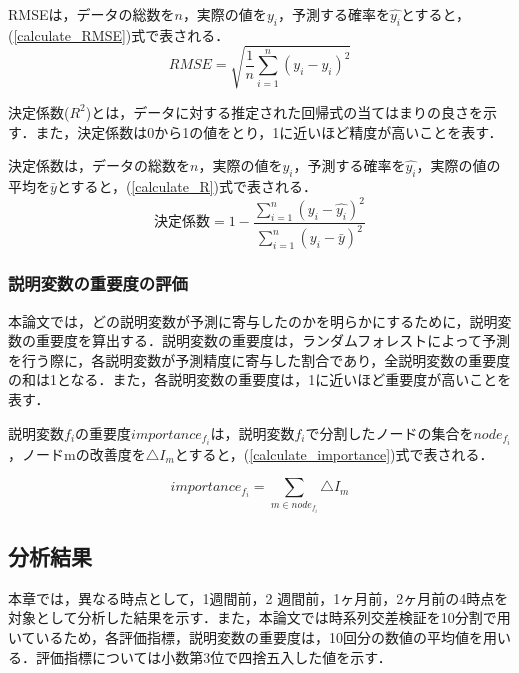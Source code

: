 \documentclass[submit,ses,noauthor]{ipsj}
\begin{document}
RMSEは，データの総数を\(n\)，実際の値を\(y_{i}\)，予測する確率を\(\hat{y_{i}}\)とすると，(\ref{calculate_RMSE})式で表される．
\begin{equation}
\label{calculate_RMSE}
RMSE = \sqrt{\frac{1}{n}\sum^{n}_{i=1}(y_{i} - \hat{y_{i}})^{2}}
\end{equation}

決定係数(\(R^{2}\))とは，データに対する推定された回帰式の当てはまりの良さを示す．また，決定係数は0から1の値をとり，1に近いほど精度が高いことを表す．

決定係数は，データの総数を\(n\)，実際の値を\(y_{i}\)，予測する確率を\(\hat{y_{i}}\)，実際の値の平均を\(\bar{y}\)とすると，(\ref{calculate_R})式で表される．
\begin{equation}
\label{calculate_R}
 \mbox{決定係数} = 1 -  \frac{\sum^{n}_{i=1}(y_{i} - \hat{y_{i}})^{2}}{\sum^{n}_{i=1}(y_{i} - \bar{y})^{2}}
 \end{equation}


\subsubsection{説明変数の重要度の評価}
本論文では，どの説明変数が予測に寄与したのかを明らかにするために，説明変数の重要度を算出する．説明変数の重要度は，ランダムフォレストによって予測を行う際に，各説明変数が予測精度に寄与した割合であり，全説明変数の重要度の和は1となる．また，各説明変数の重要度は，1に近いほど重要度が高いことを表す．

説明変数\(f_{i}\)の重要度\(importance_{f_{i}}\)は，説明変数\(f_{i}\)で分割したノードの集合を\(node_{f_{i}}\)，ノードmの改善度を\(\triangle I_{m}\)とすると，(\ref{calculate_importance})式で表される．

\begin{equation}
\label{calculate_importance}
importance_{f_{i}} = \sum_{m\in node_{f_{i}}} \triangle I_{m}
\end{equation}


\subsection{分析結果}
本章では，異なる時点として，1週間前，2 週間前，1ヶ月前，2ヶ月前の4時点を対象として分析した結果を示す．また，本論文では時系列交差検証を10分割で用いているため，各評価指標，説明変数の重要度は，10回分の数値の平均値を用いる．評価指標については小数第3位で四捨五入した値を示す．
\end{document}
